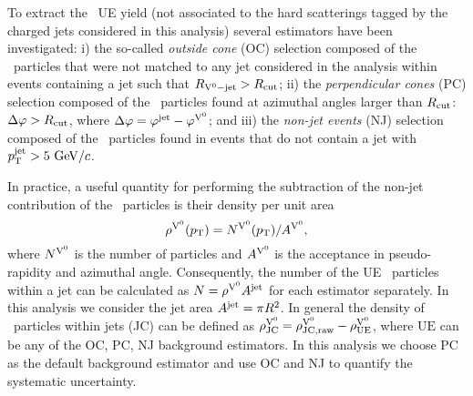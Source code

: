 



To extract the \Vzero\ UE yield (not associated to the hard scatterings tagged by the charged jets considered in this analysis) several estimators have been investigated: i) the so-called {\it outside cone} (OC) selection composed of the \Vzero\ particles that were not matched to any jet considered in the analysis within events containing a jet such that $R_{{\rm V}^{0}-{\rm jet}} > R_{\rm cut}$; ii) the {\it perpendicular cones} (PC) selection composed of the \Vzero\ particles found at azimuthal angles larger than $R_{\rm cut}$: $\Delta \varphi > R_{\rm cut}$, where $\Delta \varphi= \varphi^{\rm jet} - \varphi^{{\rm V}^{0}}$; and iii)  %
the {\it non-jet events} (NJ) selection composed of the \Vzero\ particles found in events that do not contain a jet with $p_{\mathrm{T}}^{\mathrm{jet}}>5~\mathrm{GeV}/c$.

In practice, a useful quantity for performing the subtraction of the non-jet contribution of the \Vzero\ particles is their density per unit area 
\begin{equation}
\rho^{{\rm V}^{0}}(p_{\mathrm{T}}) = N^{{\rm V}^{0}}(p_{\mathrm{T}}) / A^{{\rm V}^{0}},
\label{eq:defv0rho}
\end{equation}
where $N^{{\rm V}^{0}}$ is the number of particles and $A^{{\rm V}^{0}}$ is the acceptance in pseudo-rapidity and azimuthal angle. Consequently, the number of the UE \Vzero\ particles within a jet can be calculated as $N=\rho^{{\rm V}^{0}} A^{\mathrm{jet}}$ for each estimator separately. In this analysis we consider the jet area $A^{\mathrm{jet}} = \pi R^2$. 
In general the density of \Vzero\ particles within jets (JC) can be defined as $ \rho^{{\rm V}^{0}} _{\mathrm{JC}} =  \rho^{{\rm V}^{0}} _{\mathrm{JC, raw}} -  \rho^{{\rm V}^{0}} _{\mathrm{UE}}$, where $\mathrm{UE}$ can be any of the OC, PC, NJ background estimators. 
In this analysis we choose PC as the default background estimator and use OC and NJ to quantify the systematic uncertainty.

